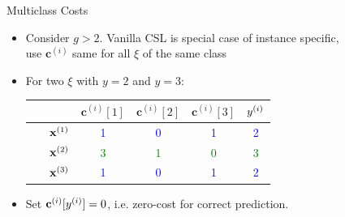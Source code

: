 \documentclass[11pt,compress,t,notes=noshow, xcolor=table]{beamer}
\newcommand{\cv}{\mathbf{c}}
\begin{document}
\begin{frame}{Multiclass Costs}
    \begin{itemize}

        \item Consider $g > 2$. Vanilla CSL is special case of instance specific,\\use $\cv^{(i)}$ same for all $\xi$ of the same class
        
        \vspace{5pt}
        
        \item For two $\xi$ with $y=2$ and $y = 3$: %
                \vspace{5pt}

                \begin{center}
                            \begin{tabular}{cc|cccc}\
        			& & $\cv^{(i)}[1]$ & $\cv^{(i)}[2]$ & $\cv^{(i)}[3]$ & $y^{(i)}$ \\
        			\hline & $\mathbf{x}^{(1)}$ & \textcolor{blue}{1} & \textcolor{blue}{0} & \textcolor{blue}{1} & \textcolor{blue}{2}\\
        			& $\mathbf{x}^{(2)}$ & \textcolor{green}{3} & \textcolor{green}{1} & \textcolor{green}{0} & \textcolor{green}{3}\\
                        & $\mathbf{x}^{(3)}$ & \textcolor{blue}{1} & \textcolor{blue}{0} & \textcolor{blue}{1} & \textcolor{blue}{2}\\
                \end{tabular}
        \end{center}

        \item Set $\cv^{(i)}[\yi] = 0$, i.e. zero-cost for correct prediction.
        \vspace{5pt}
        
            
    \end{itemize}
\end{frame}
\end{document}
